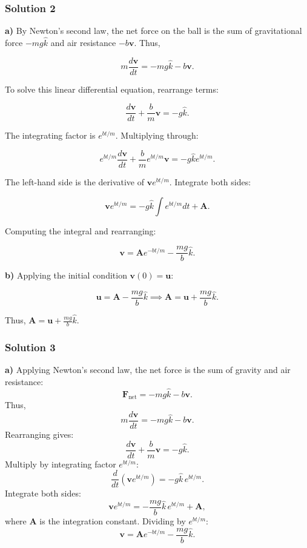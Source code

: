 \documentclass{article}
\begin{document}
\subsubsection{Solution 2}

\textbf{a)} By Newton's second law, the net force on the ball is the sum of gravitational force $-mg \hat{k}$ and air resistance $-b \mathbf{v}$. Thus,

\[
m \frac{d \mathbf{v}}{dt} = -mg \hat{k} - b \mathbf{v}.
\]

To solve this linear differential equation, rearrange terms:

\[
\frac{d \mathbf{v}}{dt} + \frac{b}{m} \mathbf{v} = -g \hat{k}.
\]

The integrating factor is $e^{bt/m}$. Multiplying through:

\[
e^{bt/m} \frac{d \mathbf{v}}{dt} + \frac{b}{m} e^{bt/m} \mathbf{v} = -g \hat{k} e^{bt/m}.
\]

The left-hand side is the derivative of $\mathbf{v} e^{bt/m}$. Integrate both sides:

\[
\mathbf{v} e^{bt/m} = -g \hat{k} \int e^{bt/m} dt + \mathbf{A}.
\]

Computing the integral and rearranging:

\[
\mathbf{v} = \mathbf{A} e^{-bt/m} - \frac{mg}{b} \hat{k}.
\]

\textbf{b)} Applying the initial condition $\mathbf{v}(0) = \mathbf{u}$:

\[
\mathbf{u} = \mathbf{A} - \frac{mg}{b} \hat{k} \implies \mathbf{A} = \mathbf{u} + \frac{mg}{b} \hat{k}.
\]

Thus, $\mathbf{A} = \mathbf{u} + \frac{mg}{b} \hat{k}$.

\subsubsection{Solution 3}

\textbf{a)} Applying Newton's second law, the net force is the sum of gravity and air resistance:  
\[
\mathbf{F}_{\text{net}} = -mg \hat{k} - b \mathbf{v}.
\]
Thus,  
\[
m \frac{d \mathbf{v}}{dt} = -mg \hat{k} - b \mathbf{v}.
\]  
Rearranging gives:  
\[
\frac{d \mathbf{v}}{dt} + \frac{b}{m} \mathbf{v} = -g \hat{k}.
\]  
Multiply by integrating factor \( e^{bt/m} \):  
\[
\frac{d}{dt} \left( \mathbf{v} e^{bt/m} \right) = -g \hat{k} \, e^{bt/m}.
\]  
Integrate both sides:  
\[
\mathbf{v} e^{bt/m} = -\frac{mg}{b} \hat{k} \, e^{bt/m} + \mathbf{A},
\]  
where \( \mathbf{A} \) is the integration constant. Dividing by \( e^{bt/m} \):  
\[
\mathbf{v} = \mathbf{A} e^{-bt/m} - \frac{mg}{b} \hat{k}.
\]
\end{document}
